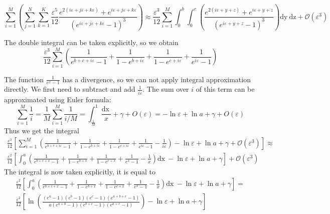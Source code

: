 \documentclass{article}
\newcommand{\dx}{\mathrm{dx}~}
\newcommand{\dy}{\mathrm{dy}~}
\newcommand{\dz}{\mathrm{dz}}
\begin{document}
\begin{equation}
  \label{eq:9}
\sum_{i=1}^{M}\left(\sum_{j=1}^{N}\sum_{k=1}^{K}\frac{\varepsilon^{5}}{12}
      \frac{e^{2(i\varepsilon+j\varepsilon+k\varepsilon)}+e^{i\varepsilon+j\varepsilon+k\varepsilon}}{\left(e^{i\varepsilon+j\varepsilon+k\varepsilon}-1\right)^{3}}  \right)\approx
    \frac{\varepsilon^{3}}{12}\sum_{i=1}^{M} \int_{0}^{b}\int_{0}^{c}
      \left(\frac{e^{2(i\varepsilon+y+z)}+e^{i\varepsilon+y+z}}{\left(e^{i\varepsilon+y+z}-1\right)^{3}}\right) \dy \dz+\mathcal{O}(\varepsilon^{3})
\end{equation}

The double integral can be taken explicitly, so we obtain
\begin{equation}
  \label{eq:11}
  \frac{\varepsilon^{3}}{12}\sum_{i=1}^{M}\left(     \frac{1}{e^{b+c+i\varepsilon}-1}+
  \frac{1}{1-e^{b+i\varepsilon}}+\frac{1}{1-e^{c+i\varepsilon}}+\frac{1}{e^{i\varepsilon}-1}\right)
\end{equation}

The function $\frac{1}{e^{x}-1}$ has a divergence, so we can not apply integral approximation directly. We first need to 
subtract and add $\frac{1}{i\varepsilon}$. The sum over $i$ of this term can be approximated using Euler formula:
\begin{equation}
    \label{eq:24}
    \sum_{i=1}^{M}\frac{1}{i}=\frac{1}{M}\sum_{i=1}^{M}\frac{1}{i/M}=\int_{\frac{1}{M}}^{1}\frac{\dx}{x}+\gamma+O(\varepsilon)=-\ln\varepsilon+\ln a+\gamma+O(\varepsilon)
  \end{equation}
Thus we get the integral
\begin{multline}
  \label{eq:13}
    \frac{\varepsilon^{3}}{12}\left[\sum_{i=1}^{M}\left(     \frac{1}{e^{b+c+i\varepsilon}-1}+
      \frac{1}{1-e^{b+i\varepsilon}}+\frac{1}{1-e^{c+i\varepsilon}}+\frac{1}{e^{i\varepsilon}-1}-\frac{1}{i\varepsilon}\right)-\ln\varepsilon+\ln a+\gamma+\mathcal{O}(\varepsilon^{3})\right]\approx\\
   \frac{\varepsilon^{2}}{12}\left[\int_{0}^{a}\left(     \frac{1}{e^{b+c+x}-1}+
      \frac{1}{1-e^{b+x}}+\frac{1}{1-e^{c+x}}+\frac{1}{e^{x}-1}-\frac{1}{x}\right)\dx-\ln\varepsilon+\ln a+\gamma\right]+\mathcal{O}(\varepsilon^{3})    
\end{multline}
The integral is now taken explicitly, it is equal to
\begin{multline}
  \label{eq:22}
     \frac{\varepsilon^{2}}{12}\left[\int_{0}^{a}\left(     \frac{1}{e^{b+c+x}-1}+
         \frac{1}{1-e^{b+x}}+\frac{1}{1-e^{c+x}}+\frac{1}{e^{x}-1}-\frac{1}{x}\right)\dx-\ln\varepsilon+\ln a+\gamma\right]=\\
     \frac{\varepsilon^{2}}{12}\left[\ln \left(\frac{(e^{a}-1)(e^{b}-1)(e^{c}-1)(e^{a+b+c}-1)}{a (e^{a+b}-1)(e^{b+c}-1)(e^{a+c}-1)}\right)-\ln\varepsilon+\ln a+\gamma\right]
\end{multline}
\end{document}
